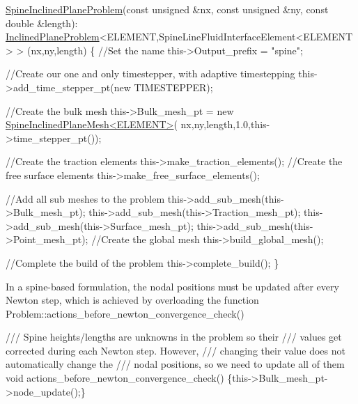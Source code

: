 \begin{DoxyCodeInclude}
 \hyperlink{classSpineInclinedPlaneProblem}{SpineInclinedPlaneProblem}(\textcolor{keyword}{const} \textcolor{keywordtype}{unsigned} &nx, \textcolor{keyword}{const} \textcolor{keywordtype}{unsigned} &ny,
                      \textcolor{keyword}{const} \textcolor{keywordtype}{double} &length): 
  \hyperlink{classInclinedPlaneProblem}{InclinedPlaneProblem}<ELEMENT,SpineLineFluidInterfaceElement<ELEMENT> >
  (nx,ny,length) 
  \{
   \textcolor{comment}{//Set the name}
   this->Output\_prefix = \textcolor{stringliteral}{"spine"};

   \textcolor{comment}{//Create our one and only timestepper, with adaptive timestepping}
   this->add\_time\_stepper\_pt(\textcolor{keyword}{new} TIMESTEPPER);

   \textcolor{comment}{//Create the bulk mesh}
   this->Bulk\_mesh\_pt = \textcolor{keyword}{new}  \hyperlink{classSpineInclinedPlaneMesh}{SpineInclinedPlaneMesh<ELEMENT>}(
    nx,ny,length,1.0,this->time\_stepper\_pt());

   \textcolor{comment}{//Create the traction elements}
   this->make\_traction\_elements();
   \textcolor{comment}{//Create the free surface elements}
   this->make\_free\_surface\_elements();

   \textcolor{comment}{//Add all sub meshes to the problem}
   this->add\_sub\_mesh(this->Bulk\_mesh\_pt);
   this->add\_sub\_mesh(this->Traction\_mesh\_pt);
   this->add\_sub\_mesh(this->Surface\_mesh\_pt);
   this->add\_sub\_mesh(this->Point\_mesh\_pt);
   \textcolor{comment}{//Create the global mesh}
   this->build\_global\_mesh();

   \textcolor{comment}{//Complete the build of the problem}
   this->complete\_build();
  \}

\end{DoxyCodeInclude}


In a spine-\/based formulation, the nodal positions must be updated after every Newton step, which is achieved by overloading the function {\ttfamily Problem\+::actions\+\_\+before\+\_\+newton\+\_\+convergence\+\_\+check()} 
\begin{DoxyCodeInclude}
 \textcolor{comment}{/// Spine heights/lengths are unknowns in the problem so their}
\textcolor{comment}{ /// values get corrected during each Newton step. However,}
\textcolor{comment}{}\textcolor{comment}{ /// changing their value does not automatically change the}
\textcolor{comment}{}\textcolor{comment}{ /// nodal positions, so we need to update all of them}
\textcolor{comment}{} \textcolor{keywordtype}{void} actions\_before\_newton\_convergence\_check()
  \{this->Bulk\_mesh\_pt->node\_update();\}

\end{DoxyCodeInclude}


